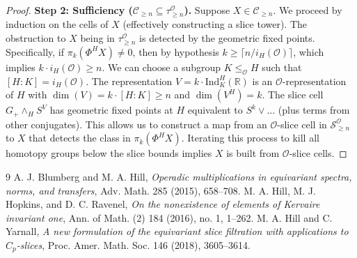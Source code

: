 \documentclass[11pt]{article}
\theoremstyle{plain}
\theoremstyle{definition}
\newcommand{\Ocal}{\mathcal{O}}
\newcommand{\Ind}{\mathrm{Ind}}
\newcommand{\ceil}[1]{\lceil #1 \rceil}
\begin{document}
\begin{proof}
    \textbf{Step 2: Sufficiency ($\mathcal{C}_{\ge n} \subseteq \tau_{\ge n}^\Ocal$).}
    Suppose $X \in \mathcal{C}_{\ge n}$. We proceed by induction on the cells of $X$ (effectively constructing a slice tower). The obstruction to $X$ being in $\tau_{\ge n}^\Ocal$ is detected by the geometric fixed points.
    Specifically, if $\pi_k(\Phi^H X) \neq 0$, then by hypothesis $k \ge \ceil{n/i_H(\Ocal)}$, which implies $k \cdot i_H(\Ocal) \ge n$.
    We can choose a subgroup $K \le_{\Ocal} H$ such that $[H:K] = i_H(\Ocal)$. The representation $V = k \cdot \Ind_K^H(\mathbb{R})$ is an $\Ocal$-representation of $H$ with $\dim(V) = k \cdot [H:K] \ge n$ and $\dim(V^H) = k$.
    The slice cell $G_+ \wedge_H S^V$ has geometric fixed points at $H$ equivalent to $S^k \vee \dots$ (plus terms from other conjugates).
    This allows us to construct a map from an $\Ocal$-slice cell in $\mathcal{S}_{\ge n}^\Ocal$ to $X$ that detects the class in $\pi_k(\Phi^H X)$.
    Iterating this process to kill all homotopy groups below the slice bounds implies $X$ is built from $\Ocal$-slice cells.
\end{proof}

\begin{thebibliography}{9}
 A. J. Blumberg and M. A. Hill, \textit{Operadic multiplications in equivariant spectra, norms, and transfers}, Adv. Math. 285 (2015), 658--708.
 M. A. Hill, M. J. Hopkins, and D. C. Ravenel, \textit{On the nonexistence of elements of Kervaire invariant one}, Ann. of Math. (2) 184 (2016), no. 1, 1--262.
 M. A. Hill and C. Yarnall, \textit{A new formulation of the equivariant slice filtration with applications to $C_p$-slices}, Proc. Amer. Math. Soc. 146 (2018), 3605--3614.
\end{thebibliography}
\end{document}
